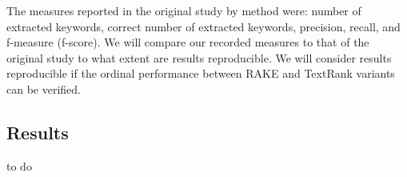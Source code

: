 \documentclass[11pt,a4paper]{article}
\begin{document}
The measures reported in the original study by method were: number of extracted keywords, correct number of extracted keywords, precision, recall, and f-measure (f-score).  We will compare our recorded measures to that of the original study to what extent are  results reproducible. We will consider  results reproducible if the ordinal performance between RAKE and TextRank variants can be verified. 

\subsection{Results}
to do 

\lipsum[3]
\begin{table*}[t]
\end{table*} 
\end{document}
